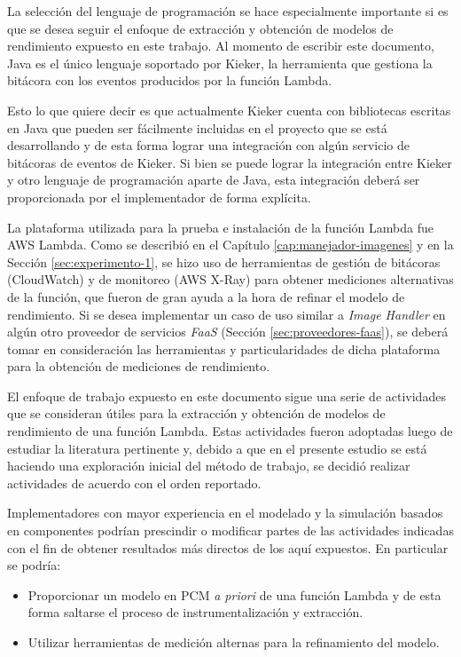 La selección del lenguaje de programación se hace especialmente importante si es que se desea seguir el enfoque de extracción y obtención de modelos de rendimiento expuesto en este trabajo. Al momento de escribir este documento, Java es el único lenguaje soportado por Kieker, la herramienta que gestiona la bitácora con los eventos producidos por la función Lambda.

Esto lo que quiere decir es que actualmente Kieker cuenta con bibliotecas escritas en Java que pueden ser fácilmente incluidas en el proyecto que se está desarrollando y de esta forma lograr una integración con algún servicio de bitácoras de eventos de Kieker. Si bien se puede lograr la integración entre Kieker y otro lenguaje de programación aparte de Java, esta integración deberá ser proporcionada por el implementador de forma explícita. 

La plataforma utilizada para la prueba e instalación de la función Lambda fue AWS Lambda. Como se describió en el Capítulo \ref{cap:manejador-imagenes} y en la Sección \ref{sec:experimento-1}, se hizo uso de herramientas de gestión de bitácoras (CloudWatch) y de monitoreo (AWS X-Ray) para obtener mediciones alternativas de la función, que fueron de gran ayuda a la hora de refinar el modelo de rendimiento. Si se desea implementar un caso de uso similar a \emph{Image Handler} en algún otro proveedor de servicios \emph{FaaS} (Sección \ref{sec:proveedores-faas}), se deberá  tomar en consideración las herramientas y particularidades de dicha plataforma para la obtención de mediciones de rendimiento.

El enfoque de trabajo expuesto en este documento sigue una serie de actividades que se consideran útiles para la extracción y obtención de modelos de rendimiento de una función Lambda. Estas actividades fueron adoptadas luego de estudiar la literatura pertinente y, debido a que en el presente estudio se está haciendo una exploración inicial del método de trabajo, se decidió realizar actividades de acuerdo con el orden reportado.

Implementadores con mayor experiencia en el modelado y la simulación basados en componentes podrían prescindir o modificar partes de las actividades indicadas con el fin de obtener resultados más directos de los aquí expuestos. En particular se podría:
\begin{itemize}
    \item Proporcionar un modelo en PCM \emph{a priori} de una función Lambda y de esta forma saltarse el proceso de instrumentalización y extracción.
    \item Utilizar herramientas de medición alternas para la refinamiento del modelo.
\end{itemize}

